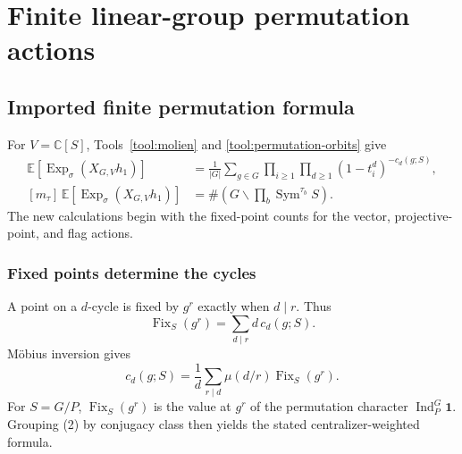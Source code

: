 \documentclass[10pt]{article}
\newcommand{\Sym}{\operatorname{Sym}}
\newcommand{\Fix}{\operatorname{Fix}}
\newcommand{\ExpS}{\operatorname{Exp}_{\sigma}}
\newcommand{\SMG}{\operatorname{SMG}}
\newcommand{\smgv}[2]{\mathbb E\!\left[\ExpS\!\left(X_{#1,#2}h_1\right)\right]}
\newcommand{\F}{\mathbb F}
\begin{document}
\section{Finite linear-group permutation actions}\label{proof:finite-linear}
\begingroup
{}
\providecommand{\Sym}{\operatorname{Sym}}
\renewcommand{\Sym}{\operatorname{Sym}}
\providecommand{\Fix}{\operatorname{Fix}}
\renewcommand{\Fix}{\operatorname{Fix}}
\providecommand{\F}{\mathbb F}
\renewcommand{\F}{\mathbb F}
\providecommand{\Sg}{\SMG}
\renewcommand{\Sg}{\SMG}
\setcounter{theorem}{0}
\setcounter{proposition}{0}
\setcounter{lemma}{0}
\setcounter{corollary}{0}
\setcounter{remark}{0}
\begin{abstract}
For a finite group acting on a set $S$, we prove the determinant/cycle formula,
its fixed-point reconstruction, and its interpretation as an orbit count on
tuples of multisets.  We then specialize to nonzero-vector, projective-point,
and complete-flag actions of finite linear groups.  Exact finite-field matrix
enumerations verify all coefficients through degree three for
$PSL_3(2)$, the degree-two vector claims for $GL_2(3)$, and the Bruhat
obstruction in ranks two and three.  The computation also exposes a sharp
boundary phenomenon for $SL_2(3)$.
\end{abstract}

\subsection{Imported finite permutation formula}
For $V=\mathbb C[S]$, Tools~\ref{tool:molien} and
\ref{tool:permutation-orbits} give
\begin{align}
 \smgv{G}{V}
 &=\frac1{|G|}\sum_{g\in G}
 \prod_{i\geq1}\prod_{d\geq1}(1-t_i^d)^{-c_d(g;S)},\\
 [m_\tau]\,\smgv{G}{V}
 &=\#\left(G\backslash\prod_b\Sym^{\tau_b}S\right).
\end{align}
The new calculations begin with the fixed-point counts for the vector,
projective-point, and flag actions.

\subsubsection*{Fixed points determine the cycles}
A point on a $d$-cycle is fixed by $g^r$ exactly when $d\mid r$.  Thus
\[
 \Fix_S(g^r)=\sum_{d\mid r}d\,c_d(g;S).
\]
M\"obius inversion gives
\begin{equation}
 \boxed{c_d(g;S)=\frac1d\sum_{r\mid d}
 \mu(d/r)\Fix_S(g^r).}
\end{equation}
For $S=G/P$, $\Fix_S(g^r)$ is the value at $g^r$ of the permutation
character $\operatorname{Ind}_P^G\mathbf1$.  Grouping (2) by conjugacy class
then yields the stated centralizer-weighted formula.
\end{document}
